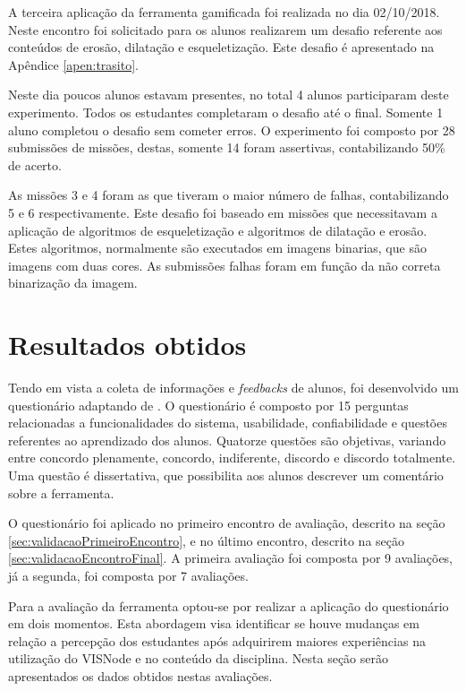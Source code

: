 \documentclass[
	12pt,				%
	oneside,			%
	a4paper,			%
	english,			%
	french,				%
	spanish,			%
	brazil,				%
	]{abntex2}
\begin{document}
A terceira aplicação da ferramenta gamificada foi realizada no dia 02/10/2018. Neste encontro foi solicitado para os alunos realizarem um desafio referente aos conteúdos de erosão, dilatação e esqueletização. Este desafio é apresentado na Apêndice \ref{apen:trasito}. 

Neste dia poucos alunos estavam presentes, no total 4 alunos participaram deste experimento. Todos os estudantes completaram o desafio até o final. Somente 1 aluno completou o desafio sem cometer erros. O experimento foi composto por 28 submissões de missões, destas, somente 14 foram assertivas, contabilizando 50\% de acerto.

As missões 3 e 4 foram as que tiveram o maior número de falhas, contabilizando 5 e 6 respectivamente. Este desafio foi baseado em missões que necessitavam a aplicação de algoritmos de esqueletização e algoritmos de dilatação e erosão. Estes algoritmos, normalmente são executados em imagens binarias, que são imagens com duas cores. As submissões falhas foram em função da não correta binarização da imagem.

\section{Resultados obtidos}
\label{sec:resultadosObtidos}

Tendo em vista a coleta de informações e \textit{feedbacks} de alunos, foi desenvolvido um questionário adaptando de \citet{bez2013}. O questionário é composto por 15 perguntas relacionadas a funcionalidades do sistema, usabilidade, confiabilidade e questões referentes ao aprendizado dos alunos. Quatorze questões são objetivas, variando entre concordo plenamente, concordo, indiferente, discordo e discordo totalmente. Uma questão é dissertativa, que possibilita aos alunos descrever um comentário sobre a ferramenta.

O questionário foi aplicado no primeiro encontro de avaliação, descrito na seção \ref{sec:validacaoPrimeiroEncontro}, e no último encontro, descrito na seção \ref{sec:validacaoEncontroFinal}. A primeira avaliação foi composta por 9 avaliações, já a segunda, foi composta por 7 avaliações.

Para a avaliação da ferramenta optou-se por realizar a aplicação do questionário em dois momentos. Esta abordagem visa identificar se houve mudanças em relação a percepção dos estudantes após   adquirirem maiores experiências na utilização do VISNode e no conteúdo da disciplina. Nesta seção serão apresentados os dados obtidos nestas avaliações.
\end{document}
